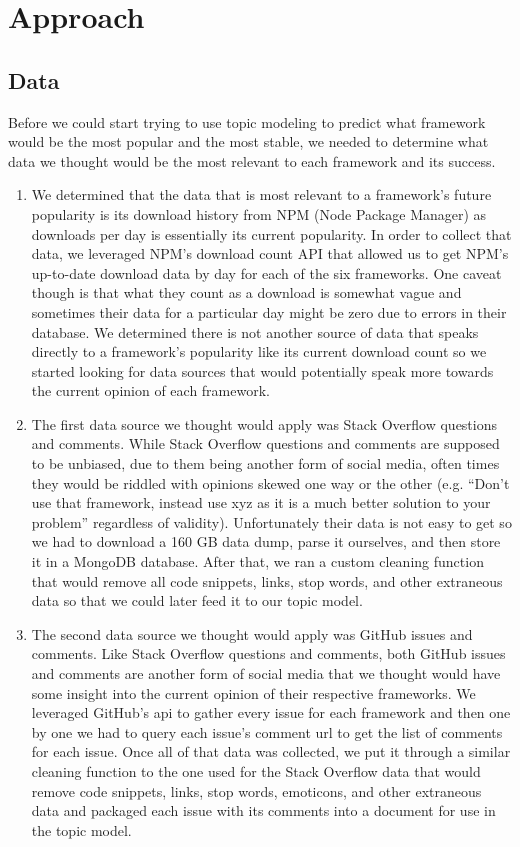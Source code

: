 \documentclass[conference]{IEEEtran}
\begin{document}
\section{Approach}
\subsection{Data}
Before we could start trying to use topic modeling to predict what framework would be the most popular and the most stable, we needed to determine what data we thought would be the most relevant to each framework and its success.
\begin{enumerate}
    \item  We determined that the data that is most relevant to a framework's future popularity is its download history from NPM (Node Package Manager) as downloads per day is essentially its current popularity. In order to collect that data, we leveraged NPM's download count API that allowed us to get NPM's up-to-date download data by day for each of the six frameworks. One caveat though is that what they count as a download is somewhat vague and sometimes their data for a particular day might be zero due to errors in their database. We determined there is not another source of data that speaks directly to a framework's popularity like its current download count so we started looking for data sources that would potentially speak more towards the current opinion of each framework.
    
    \item  The first data source we thought would apply was Stack Overflow questions and comments. While Stack Overflow questions and comments are supposed to be unbiased, due to them being another form of social media, often times they would be riddled with opinions skewed one way or the other (e.g. “Don't use that framework, instead use xyz as it is a much better solution to your problem” regardless of validity). Unfortunately their data is not easy to get so we had to download a 160 GB data dump, parse it ourselves, and then store it in a MongoDB database. After that, we ran a custom cleaning function that would remove all code snippets, links, stop words, and other extraneous data so that we could later feed it to our topic model.
    
    \item  The second data source we thought would apply was GitHub issues and comments. Like Stack Overflow questions and comments, both GitHub issues and comments are another form of social media that we thought would have some insight into the current opinion of their respective frameworks. We leveraged GitHub's api to gather every issue for each framework and then one by one we had to query each issue's comment url to get the list of comments for each issue. Once all of that data was collected, we put it through a similar cleaning function to the one used for the Stack Overflow data that would remove code snippets, links, stop words, emoticons, and other extraneous data and packaged each issue with its comments into a document for use in the topic model.
\end{enumerate}
\end{document}
